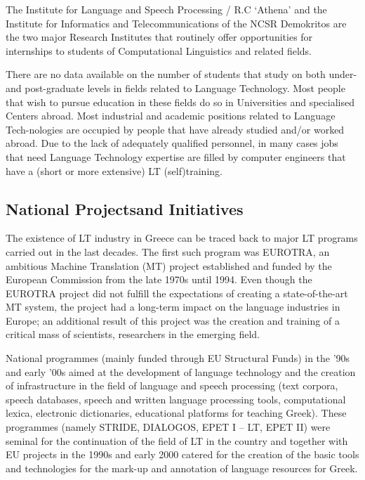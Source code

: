 \begin{multicols}{2}
The Institute for Language and Speech Processing / R.C ‘Athena’ and the Institute for Informatics and Telecommunications of the NCSR Demokritos are the two major Research Institutes that routinely offer opportunities for internships to students of Computational Linguistics and related fields.

There are no data available on the number of students that study on both under- and post-graduate levels in fields related to Language Technology. Most people that wish to pursue education in these fields do so in Universities and specialised Centers abroad. Most industrial and academic positions related to Language Tech-nologies are occupied by people that have already studied and/or worked abroad. Due to the lack of adequately qualified personnel, in many cases jobs that need Language Technology expertise are filled by computer engineers that have a (short or more extensive) LT (self)training.

\subsection[National Projects and Initiatives]{National Projects\newline and Initiatives}

The existence of LT industry in Greece can be traced back to major LT programs carried out in the last decades. The first such program was EUROTRA, an ambitious Machine Translation (MT) project established and funded by the European Commission from the late 1970s until 1994. Even though the EUROTRA project did not fulfill the expectations of creating a state-of-the-art MT system, the project had a long-term impact on the language industries in Europe; an additional result of this project was the creation and training of a critical mass of scientists, researchers in the emerging field. 

National programmes (mainly funded through EU Structural Funds) in the '90s and early '00s aimed at the development of language technology and the creation of infrastructure in the field of language and speech processing (text corpora, speech databases, speech and written language processing tools, computational lexica, electronic dictionaries, educational platforms for teaching Greek). These programmes (namely STRIDE, DIALOGOS, EPET I – LT, EPET II) were seminal for the continuation of the field of LT in the country and together with EU projects in the 1990s and early 2000 catered for the creation of the basic tools and technologies for the mark-up and annotation of language resources for Greek.


\end{multicols}
